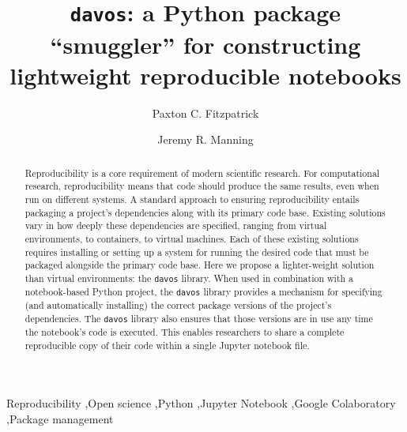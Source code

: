 \documentclass[preprint,12pt,a4paper]{elsarticle}
\begin{document}
\begin{frontmatter}

\title{\texttt{davos}: a Python package ``smuggler'' for constructing
  lightweight reproducible notebooks}
\author{Paxton C. Fitzpatrick}
\author{Jeremy R. Manning}
\address{Department of Psychological and Brain Sciences\\Dartmouth College, Hanover, NH 03755}


\begin{abstract}

  Reproducibility is a core requirement of modern scientific research.
  For computational research, reproducibility means that code should
  produce the same results, even when run on different systems.  A
  standard approach to ensuring reproducibility entails packaging a
  project's dependencies along with its primary code base.  Existing
  solutions vary in how deeply these dependencies are specified,
  ranging from virtual environments, to containers, to virtual
  machines.  Each of these existing solutions requires installing or
  setting up a system for running the desired code that must be
  packaged alongside the primary code base.  Here we propose a
  lighter-weight solution than virtual environments: the
  \texttt{davos} library.  When used in combination with a
  notebook-based Python project, the \texttt{davos} library provides a
  mechanism for specifying (and automatically installing) the correct
  package versions of the project's dependencies.  The \texttt{davos}
  library also ensures that those versions are in use any time the
  notebook's code is executed.  This enables researchers to share a complete
  reproducible copy of their code within a single Jupyter notebook file.

\end{abstract}


\begin{keyword}
Reproducibility \sep Open science \sep Python \sep Jupyter Notebook \sep Google Colaboratory \sep Package management
\end{keyword}

\end{frontmatter}


\end{document}
